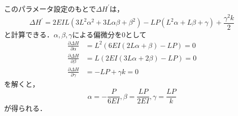 \documentclass[a4paper]{jsarticle}
\begin{document}
\subsubsection{}
このパラメータ設定のもとで$\Delta H^{\prime}$は，
\begin{equation}
  \Delta H^{\prime} =
  2 E I L \left(3 L^{2} \alpha^{2} + 3 L \alpha \beta + \beta^{2}\right) - L P \left(L^{2} \alpha + L \beta + \gamma\right) + \frac{\gamma^{2} k}{2}
\end{equation}
と計算できる．$\alpha, \beta, \gamma$による偏微分を$0$として
\begin{align}
  \frac{\partial \Delta H}{\partial \alpha} & =
  L^{2} \left(6 E I \left(2 L \alpha + \beta\right) - L P\right) = 0 \\
  \frac{\partial \Delta H}{\partial \beta}  & =
  L \left(2 E I \left(3 L \alpha + 2 \beta\right) - L P\right)= 0    \\
  \frac{\partial \Delta H}{\partial \gamma} & =
  -L P + \gamma k = 0
\end{align}
を解くと，
\begin{equation}
  \alpha = -\frac{P}{6 E I}, \beta = \frac{LP}{2EI},
  \gamma= \frac{LP}{k}
\end{equation}
が得られる．
\end{document}
